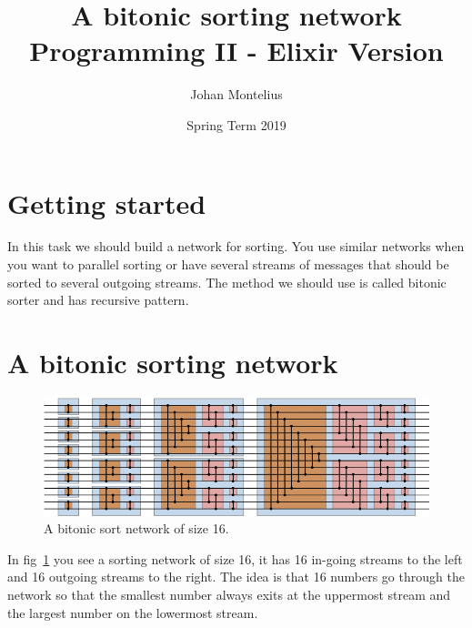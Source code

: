 \documentclass[a4paper,11pt]{article}
\begin{document}

\title{
    \textbf{A bitonic sorting network}\\
    \large{Programming II - Elixir Version}
}
\author{Johan Montelius}
\date{Spring Term 2019}
\maketitle
\thispagestyle{fancy}



\section*{Getting started}

In this task we should build a network for sorting. You use similar
networks when you want to parallel sorting or have several streams of
messages that should be sorted to several outgoing streams. The method
we should use is called bitonic sorter and has recursive pattern.

  

\section{A bitonic sorting network}


\begin{figure}
  \includegraphics[width=\linewidth]{BitonicSort.png}
  \caption{A bitonic sort network of size 16.}
  \label{fig:bitonic}  
\end{figure}

In fig~\ref{fig:bitonic} you see a sorting network of size 16, it has
16 in-going streams to the left and 16 outgoing streams to the
right. The idea is that 16 numbers go through the network so that the
smallest number always exits at the uppermost stream and the largest
number on the lowermost stream.
\end{document}
